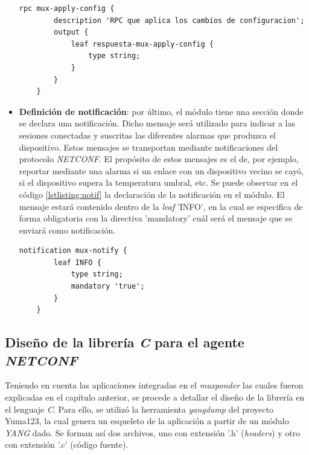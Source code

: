 \begin{itemize}
    

    \begin{lstlisting}[language=SHELXL, caption=Declaración de \textit{RPC}., label=lstlisting:RPC]
    rpc mux-apply-config {        
        description 'RPC que aplica los cambios de configuracion';
        output {
            leaf respuesta-mux-apply-config {
                type string;
            }
        }
    }
    \end{lstlisting}

    \item \textbf{Definición de notificación}: por último, el módulo tiene una sección donde se declara una notificación. Dicho mensaje será utilizado para indicar a las sesiones conectadas y suscritas las diferentes alarmas que produzca el dispositivo. Estos mensajes se transportan mediante notificaciones del protocolo \textit{NETCONF}. El propósito de estos mensajes es el de, por ejemplo, reportar mediante una alarma si un enlace con un dispositivo vecino se cayó, si el dispositivo supera la temperatura umbral, etc. Se puede observar en el código \ref{lstlisting:notif} la declaración de la notificación en el módulo. El mensaje estará contenido dentro de la \textit{leaf} ’INFO’, en la cual se especifica de forma obligatoria con la directiva ’mandatory’ cuál será el mensaje que se enviará como notificación.

    \begin{lstlisting}[language=SHELXL, caption=Declaración de notificación., label=lstlisting:notif]
    notification mux-notify {
        leaf INFO {
            type string;
            mandatory 'true';
        }
    }
    \end{lstlisting}

\end{itemize}

\subsection{Diseño de la librería \textit{C} para el agente \textit{NETCONF}}


  Teniendo en cuenta las aplicaciones integradas en el \textit{muxponder} las cuales fueron explicadas en el capítulo anterior, se procede a detallar el diseño de la librería en el lenguaje \textit{C}. Para ello, se utilizó la herramienta \textit{yangdump} del proyecto Yuma123, la cual genera un esqueleto de la aplicación a partir de un módulo \textit{YANG} dado. Se forman así dos archivos, uno con extensión '.h' (\textit{headers}) y otro con extensión '.c' (código fuente). 
  

